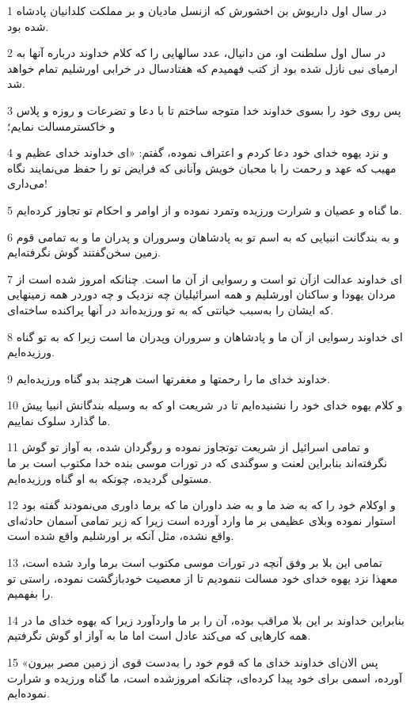 \par 1 در سال اول داریوش بن اخشورش که ازنسل مادیان و بر مملکت کلدانیان پادشاه شده بود.
\par 2 در سال اول سلطنت او، من دانیال، عدد سالهایی را که کلام خداوند درباره آنها به ارمیای نبی نازل شده بود از کتب فهمیدم که هفتادسال در خرابی اورشلیم تمام خواهد شد.
\par 3 پس روی خود را بسوی خداوند خدا متوجه ساختم تا با دعا و تضرعات و روزه و پلاس و خاکسترمسالت نمایم؛
\par 4 و نزد یهوه خدای خود دعا کردم و اعتراف نموده، گفتم: «ای خداوند خدای عظیم و مهیب که عهد و رحمت را با محبان خویش وآنانی که فرایض تو را حفظ می‌نمایند نگاه می‌داری!
\par 5 ما گناه و عصیان و شرارت ورزیده وتمرد نموده و از اوامر و احکام تو تجاوز کرده‌ایم.
\par 6 و به بندگانت انبیایی که به اسم تو به پادشاهان وسروران و پدران ما و به تمامی قوم زمین سخن‌گفتند گوش نگرفته‌ایم.
\par 7 ‌ای خداوند عدالت ازآن تو است و رسوایی از آن ما است. چنانکه امروز شده است از مردان یهودا و ساکنان اورشلیم و همه اسرائیلیان چه نزدیک و چه دوردر همه زمینهایی که ایشان را به‌سبب خیانتی که به تو ورزیده‌اند در آنها پراکنده ساخته‌ای.
\par 8 ‌ای خداوند رسوایی از آن ما و پادشاهان و سروران وپدران ما است زیرا که به تو گناه ورزیده‌ایم.
\par 9 خداوند خدای ما را رحمتها و مغفرتها است هرچند بدو گناه ورزیده‌ایم.
\par 10 و کلام یهوه خدای خود را نشنیده‌ایم تا در شریعت او که به وسیله بندگانش انبیا پیش ما گذارد سلوک نماییم.
\par 11 و تمامی اسرائیل از شریعت توتجاوز نموده و روگردان شده، به آواز تو گوش نگرفته‌اند بنابراین لعنت و سوگندی که در تورات موسی بنده خدا مکتوب است بر ما مستولی گردیده، چونکه به او گناه ورزیده‌ایم.
\par 12 و اوکلام خود را که به ضد ما و به ضد داوران ما که برما داوری می‌نمودند گفته بود استوار نموده وبلای عظیمی بر ما وارد آورده است زیرا که زیر تمامی آسمان حادثه‌ای واقع نشده، مثل آنکه بر اورشلیم واقع شده است.
\par 13 تمامی این بلا بر وفق آنچه در تورات موسی مکتوب است برما وارد شده است، معهذا نزد یهوه خدای خود مسالت ننمودیم تا از معصیت خودبازگشت نموده، راستی تو را بفهمیم.
\par 14 بنابراین خداوند بر این بلا مراقب بوده، آن را بر ما واردآورد زیرا که یهوه خدای ما در همه کارهایی که می‌کند عادل است اما ما به آواز او گوش نگرفتیم.
\par 15 «پس الان‌ای خداوند خدای ما که قوم خود را به‌دست قوی از زمین مصر بیرون آورده، اسمی برای خود پیدا کرده‌ای، چنانکه امروزشده است، ما گناه ورزیده و شرارت نموده‌ایم.
